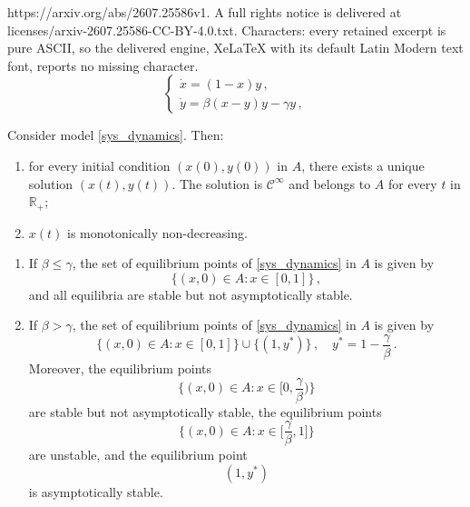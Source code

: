 \documentclass[10pt,a4paper]{amsart}
\newcommand{\R}{\mathbb R}
\newcommand{\mc}{\mathcal}
\begin{document}
https://arxiv.org/abs/2607.25586v1. A full rights notice is delivered at licenses/arxiv-2607.25586-CC-BY-4.0.txt. Characters: every retained excerpt is pure ASCII, so the delivered engine, XeLaTeX with its default Latin Modern text font, reports no missing character.
\begin{equation}
\label{sys_dynamics}
\begin{cases}
    \dot{x} = (1 - x)y\,, \\
    \dot{y} = \beta(x - y)y - \gamma y\,,
\end{cases}
\end{equation}

\begin{proposition}\label{proposition:basic}
Consider model \eqref{sys_dynamics}. Then: 
\begin{enumerate}
    \item[(i)] for every initial condition $(x(0), y(0))$ in $A$, there exists a unique solution $(x(t), y(t))$. The solution is $\mc C^\infty$ and belongs to $A$ for every $t$ in $\R_+$;
    \item[(ii)] $x(t)$ is monotonically non-decreasing.
\end{enumerate}
\end{proposition}

\begin{proposition}\label{prop:equilibria}
\begin{enumerate}
\item[(i)] If $\beta \le \gamma$, the set of equilibrium points of \eqref{sys_dynamics} in $A$ is given by
\begin{equation}\label{eq:stable_below}
\{(x,0) \in A: x \in [0,1]\}\,,
\end{equation}
and all equilibria are stable but not asymptotically stable. 
\item[(ii)] If $\beta > \gamma$, the set of equilibrium points of \eqref{sys_dynamics} in $A$ is given by 
$$\{(x,0) \in A: x \in [0,1]\} \cup \{(1,y^*)\}\,, \quad y^* = 1-\frac{\gamma}{\beta}\,.$$
Moreover, the equilibrium points 
\begin{equation}\label{eq:stable}\Big\{(x,0) \in A: x \in \Big[0,\frac\gamma\beta\Big)\Big\}\end{equation}
are stable but not asymptotically stable, the equilibrium points
\begin{equation}\label{eq:unstable}\Big\{(x,0) \in A: x \in \Big[\frac\gamma\beta,1\Big]\Big\}\end{equation}
are unstable, and the equilibrium point
\begin{equation}\label{eq:as_stable}
(1,y^*)
\end{equation}
is asymptotically stable.
\end{enumerate}
\end{proposition}
\end{document}
